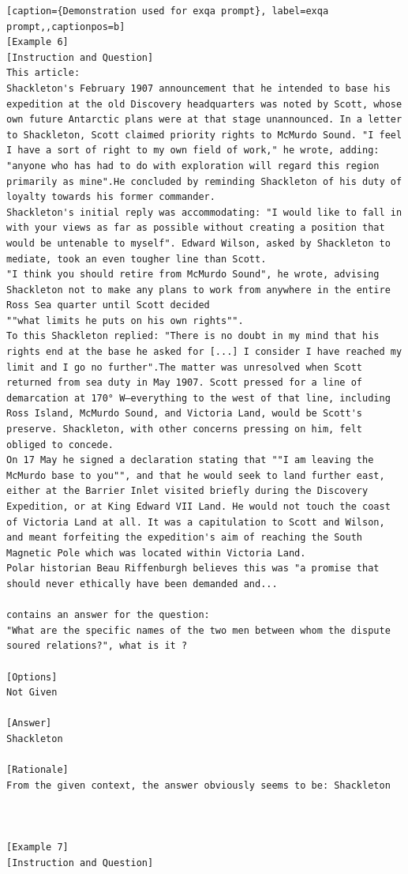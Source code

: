 \begin{lstlisting}[caption={Demonstration used for exqa prompt}, label=exqa prompt,,captionpos=b]
[Example 6]
[Instruction and Question]
This article: 
Shackleton's February 1907 announcement that he intended to base his expedition at the old Discovery headquarters was noted by Scott, whose own future Antarctic plans were at that stage unannounced. In a letter to Shackleton, Scott claimed priority rights to McMurdo Sound. "I feel I have a sort of right to my own field of work," he wrote, adding: "anyone who has had to do with exploration will regard this region primarily as mine".He concluded by reminding Shackleton of his duty of loyalty towards his former commander.
Shackleton's initial reply was accommodating: "I would like to fall in with your views as far as possible without creating a position that would be untenable to myself". Edward Wilson, asked by Shackleton to mediate, took an even tougher line than Scott. 
"I think you should retire from McMurdo Sound", he wrote, advising Shackleton not to make any plans to work from anywhere in the entire Ross Sea quarter until Scott decided 
""what limits he puts on his own rights"". 
To this Shackleton replied: "There is no doubt in my mind that his rights end at the base he asked for [...] I consider I have reached my limit and I go no further".The matter was unresolved when Scott returned from sea duty in May 1907. Scott pressed for a line of demarcation at 170° W—everything to the west of that line, including Ross Island, McMurdo Sound, and Victoria Land, would be Scott's preserve. Shackleton, with other concerns pressing on him, felt obliged to concede. 
On 17 May he signed a declaration stating that ""I am leaving the McMurdo base to you"", and that he would seek to land further east, either at the Barrier Inlet visited briefly during the Discovery Expedition, or at King Edward VII Land. He would not touch the coast of Victoria Land at all. It was a capitulation to Scott and Wilson, and meant forfeiting the expedition's aim of reaching the South Magnetic Pole which was located within Victoria Land. 
Polar historian Beau Riffenburgh believes this was "a promise that should never ethically have been demanded and... 

contains an answer for the question: 
"What are the specific names of the two men between whom the dispute soured relations?", what is it ?

[Options]
Not Given

[Answer]
Shackleton

[Rationale]
From the given context, the answer obviously seems to be: Shackleton



[Example 7]
[Instruction and Question]

    \end{lstlisting}
    




